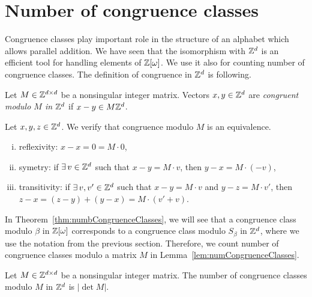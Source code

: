 \section{Number of congruence classes}
Congruence classes play important role in the structure of an alphabet which allows parallel addition. We have seen that the isomorphism with $\mathbb{Z}^d$ is an efficient tool for handling elements of $\mathbb{Z}[\omega]$. We use it also for counting number of congruence classes. The definition of congruence in $\mathbb{Z}^d$ is following.
\begin{defn}
Let $M\in\mathbb{Z}^{d\times d}$ be a nonsingular integer matrix. Vectors $x,y \in \mathbb{Z}^d$ are \emph{congruent modulo $M$ in $\mathbb{Z}^d$} if $x-y \in M\mathbb{Z}^d$.
\end{defn}
Let $x,y,z\in\mathbb{Z}^d$. We verify that congruence modulo $M$ is an equivalence. 
\begin{enumerate}[i)]
	\item reflexivity: $x-x=0=M\cdot 0$,
	\item symetry: if $\exists\, v \in\mathbb{Z}^d$ such that $x-y=M\cdot v$, then $y-x=M\cdot (-v)$,
	\item transitivity: if $\exists\, v,v'\in \mathbb{Z}^d$ such that $x-y=M\cdot v$ and $y-z=M\cdot v'$, then $z-x=(z-y)+(y-x)=M\cdot (v'+v)$.
\end{enumerate}
In Theorem~\ref{thm:numbCongruenceClasses}, we will see that a congruence class modulo $\beta$ in $\mathbb{Z}[\omega]$ corresponds to a congruence class modulo $S_\beta$ in $\mathbb{Z}^d$, where we use the notation from the previous section. Therefore, we count number of congruence classes modulo a matrix $M$ in Lemma~\ref{lem:numCongruenceClasses}.
\begin{lem}
Let $M\in\mathbb{Z}^{d\times d}$ be a nonsingular integer matrix. The number of congruence classes modulo $M$ in $\mathbb{Z}^d$ is $|\det M|$.
\label{lem:numCongruenceClasses}
\end{lem}

